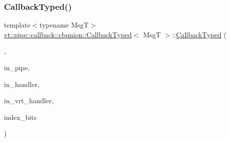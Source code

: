 \subsubsection{\texorpdfstring{Callback\+Typed()}{CallbackTyped()}\hspace{0.1cm}{\footnotesize\ttfamily [10/14]}}
{\footnotesize\ttfamily template$<$typename MsgT$>$ \\
\hyperlink{structvt_1_1pipe_1_1callback_1_1cbunion_1_1_callback_typed}{vt\+::pipe\+::callback\+::cbunion\+::\+Callback\+Typed}$<$ MsgT $>$\+::\hyperlink{structvt_1_1pipe_1_1callback_1_1cbunion_1_1_callback_typed}{Callback\+Typed} (\begin{DoxyParamCaption}\item[{Raw\+Send\+Col\+Dir\+Tag\+Type}]{,  }\item[{\hyperlink{namespacevt_ac9852acda74d1896f48f406cd72c7bd3}{Pipe\+Type} const \&}]{in\+\_\+pipe,  }\item[{\hyperlink{namespacevt_af64846b57dfcaf104da3ef6967917573}{Handler\+Type} const \&}]{in\+\_\+handler,  }\item[{\hyperlink{structvt_1_1pipe_1_1callback_1_1cbunion_1_1_callback_raw_base_single_a734a9c83099de5bc1cd85f9da8dba7bb}{Auto\+Handler\+Type} const \&}]{in\+\_\+vrt\+\_\+handler,  }\item[{void $\ast$}]{index\+\_\+bits }\end{DoxyParamCaption})\hspace{0.3cm}{\ttfamily [inline]}}

\mbox{\label{structvt_1_1pipe_1_1callback_1_1cbunion_1_1_callback_typed_a0be373f1ebb6916b873f329d82dd76ce}} 
